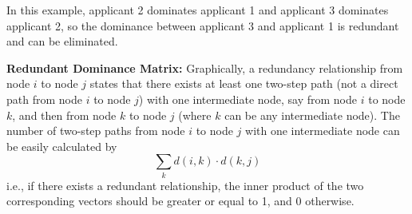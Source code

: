 \documentclass[12pt,english]{report}
\begin{document}
\begin{figure}
	\begin{floatrow}
	\capbtabbox{%
		\begin{tabular}{l|llllll}
			& 1 & 2 & 3 & 4 & 5 & 6 \\ \hline
			1 & 0 & 0 & 0 & 0 & 0 & 0 \\
			2 & 1 & 0 & 0 & 1 & 1 & 0 \\
			3 & 1 & 1 & 0 & 1 & 1 & 0 \\
			4 & 0 & 0 & 0 & 0 & 0 & 0 \\
			5 & 0 & 0 & 0 & 0 & 0 & 0 \\
			6 & 1 & 1 & 0 & 1 & 1 & 0 \\
		\end{tabular}%
	}{%
	\caption{Full Dominance relation in Matrix Form}%
	\label{full_domin}
}
\end{floatrow}
\end{figure}









In this example, applicant 2 dominates applicant 1 and applicant 3 dominates
applicant 2, so the dominance between applicant 3 and applicant 1 is redundant
and can be eliminated.

\vspace{0.1in}
\textbf{Redundant Dominance Matrix:}  Graphically, a redundancy relationship
from node $i$ to node $j$ states that there exists at least one two-step path
(not a direct path from node $i$ to node $j$) with one intermediate node, say
from node $i$ to node $k$, and then from node $k$ to node $j$ (where $k$ can be
any intermediate node).  The number of two-step paths from node $i$ to node $j$
with one intermediate node can be easily calculated by
$$ \sum_k d(i,k) \cdot  d(k,j)$$
i.e., if there exists a redundant relationship, the inner product of the two
corresponding vectors should be greater or equal to 1, and 0 otherwise.
\end{document}
